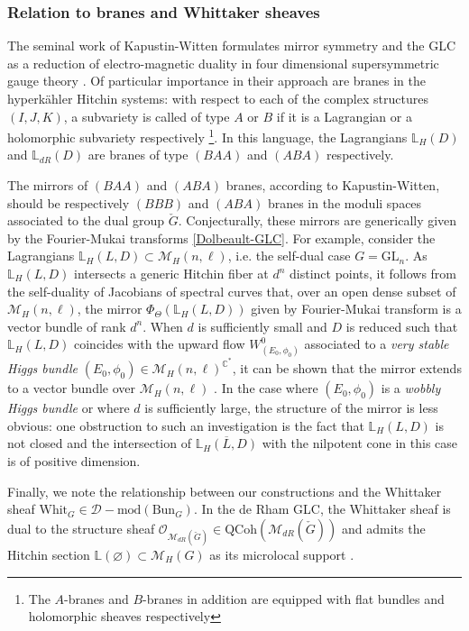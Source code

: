 \documentclass[twoside, 11pt]{article}
\numberwithin{equation}{section}
\theoremstyle{theorem}
\numberwithin{theorem}{section}
\theoremstyle{definition}
\begin{document}
\subsubsection{Relation to branes and Whittaker sheaves}
The seminal work of Kapustin-Witten formulates mirror symmetry and the GLC as a reduction of electro-magnetic duality in four dimensional supersymmetric gauge theory \cite{Kapustin-Witten06}.
Of particular importance in their approach are branes in the hyperk\"{a}hler Hitchin systems: with respect to each of the complex structures $(I, J, K)$, a subvariety is called of type $A$ or $B$ if it is a Lagrangian or a holomorphic subvariety respectively 
\footnote{The $A$-branes and $B$-branes in addition are equipped with flat bundles and holomorphic sheaves respectively}. 
In this language, the Lagrangians $\mathbb{L}_H(D)$ and $\mathbb{L}_{dR}(D)$ are branes of type $(BAA)$ and $(ABA)$ respectively.

The mirrors of $(BAA)$ and $(ABA)$ branes, according to Kapustin-Witten, should be respectively $(BBB)$ and $(ABA)$ branes in the moduli spaces associated to the dual group $\check{G}$. Conjecturally, these mirrors are generically given by the Fourier-Mukai transforms \eqref{Dolbeault-GLC}. For example, consider the Lagrangians $\mathbb{L}_H(L, D) \subset \mathcal{M}_H(n, \ell)$, i.e. the self-dual case $G = \mathrm{GL}_n$.
As $\mathbb{L}_H(L, D)$ intersects a generic Hitchin fiber at $d^n$ distinct points, it follows from the self-duality of Jacobians of spectral curves that, over an open dense subset of $\mathcal{M}_H(n, \ell)$, the mirror $\Phi_\Theta(\mathbb{L}_H(L, D))$ given by Fourier-Mukai transform is a vector bundle of rank $d^n$. 
When $d$ is sufficiently small and $D$ is reduced such that $\mathbb{L}_H(L, D)$ coincides with the upward flow $W^0_{(E_0, \phi_0)}$ associated to a \textit{very stable Higgs bundle} $(E_0, \phi_0) \in \mathcal{M}_H(n, \ell)^{\mathbb{C}^\ast}$, 
it can be shown that the mirror extends to a vector bundle over $\mathcal{M}_H(n, \ell)$ \cite{HH22}. 
In the case where $(E_0, \phi_0)$ is a \textit{wobbly Higgs bundle} or where $d$ is sufficiently large, the structure of the mirror is less obvious: one obstruction to such an investigation is the fact that $\mathbb{L}_H(L, D)$ is not closed and the intersection of $\overline{\mathbb{L}_H(L, D)}$ with the nilpotent cone in this case is of positive dimension.

Finally, we note the relationship between our constructions and the Whittaker sheaf $\mathrm{Whit}_{G} \in \mathcal{D}-\mathrm{mod}(\mathrm{Bun}_{G})$. In the de Rham GLC, the Whittaker sheaf is dual to the structure sheaf $\mathcal{O}_{\mathcal{M}_{dR}(\check{G})} \in \mathrm{QCoh}(\mathcal{M}_{dR}(\check{G}))$ and admits the Hitchin section $\mathbb{L}(\varnothing) \subset \mathcal{M}_H(G)$ as its microlocal support \cite{BenZvi26}.
\end{document}
